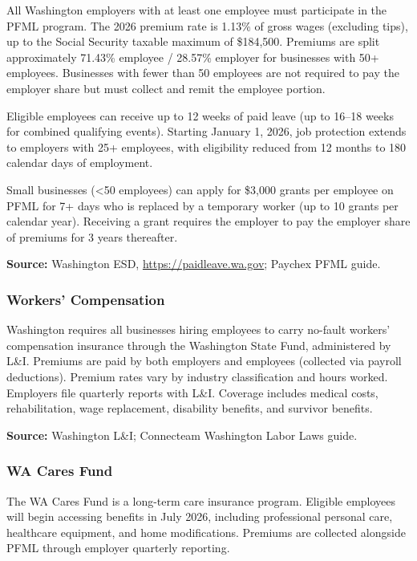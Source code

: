 \documentclass[11pt,letterpaper]{article}
\begin{document}
All Washington employers with at least one employee must participate in the PFML program. The 2026 premium rate is 1.13\% of gross wages (excluding tips), up to the Social Security taxable maximum of \$184,500. Premiums are split approximately 71.43\% employee / 28.57\% employer for businesses with 50+ employees. Businesses with fewer than 50 employees are not required to pay the employer share but must collect and remit the employee portion.

Eligible employees can receive up to 12 weeks of paid leave (up to 16--18 weeks for combined qualifying events). Starting January 1, 2026, job protection extends to employers with 25+ employees, with eligibility reduced from 12 months to 180 calendar days of employment.

Small businesses (<50 employees) can apply for \$3,000 grants per employee on PFML for 7+ days who is replaced by a temporary worker (up to 10 grants per calendar year). Receiving a grant requires the employer to pay the employer share of premiums for 3 years thereafter.

\textbf{Source:} Washington ESD, \url{https://paidleave.wa.gov}; Paychex PFML guide.

\subsubsection{Workers' Compensation}

Washington requires all businesses hiring employees to carry no-fault workers' compensation insurance through the Washington State Fund, administered by L\&I. Premiums are paid by both employers and employees (collected via payroll deductions). Premium rates vary by industry classification and hours worked. Employers file quarterly reports with L\&I. Coverage includes medical costs, rehabilitation, wage replacement, disability benefits, and survivor benefits.

\textbf{Source:} Washington L\&I; Connecteam Washington Labor Laws guide.

\subsubsection{WA Cares Fund}

The WA Cares Fund is a long-term care insurance program. Eligible employees will begin accessing benefits in July 2026, including professional personal care, healthcare equipment, and home modifications. Premiums are collected alongside PFML through employer quarterly reporting.
\end{document}
